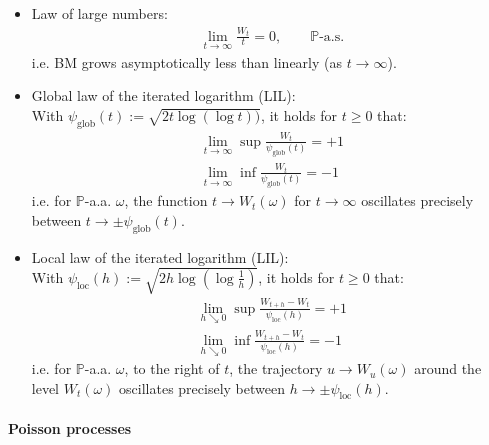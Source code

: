\documentclass[a4paper,landscape,8pt,fleqn]{scrartcl}
\begin{document}
\begin{multicols*}{3}
\begin{itemize}
\item Law of large numbers:
\begin{align*}
\lim_{t \rightarrow \infty} \frac{W_t}{t} = 0, \qquad \mathbb{P}\text{-a.s.}
\end{align*}
i.e. BM grows asymptotically less than linearly (as $t \rightarrow \infty$).
\item Global law of the iterated logarithm (LIL): \\
With $\psi_\text{glob}(t) := \sqrt{2 t \log(\log t))}$, it holds for $t \geq 0$ that:
\begin{align*}
\lim_{t \rightarrow \infty} \sup \frac{W_t}{\psi_\text{glob}(t)} = +1 \\
\lim_{t \rightarrow \infty} \inf \frac{W_t}{\psi_\text{glob}(t)} = -1
\end{align*}
i.e. for $\mathbb{P}$-a.a. $\omega$, the function $t \rightarrow W_t(\omega)$ for $t \rightarrow \infty$ oscillates precisely between $t \rightarrow \pm \psi_\text{glob}(t)$.
\item Local law of the iterated logarithm (LIL): \\
With $\psi_\text{loc}(h) := \sqrt{2 h \log(\log \frac{1}{h})}$, it holds for $t \geq 0$ that:
\begin{align*}
\lim\limits_{h \searrow 0} \sup \frac{W_{t+h} - W_t}{\psi_\text{loc}(h)} = +1 \\
\lim\limits_{h \searrow 0} \inf \frac{W_{t+h} - W_t}{\psi_\text{loc}(h)} = -1
\end{align*}
i.e. for $\mathbb{P}$-a.a. $\omega$, to the right of $t$, the trajectory $u \rightarrow W_u(\omega)$ around the level $W_t(\omega)$ oscillates precisely between $h \rightarrow \pm \psi_\text{loc}(h)$.
\end{itemize}

\paragraph{Poisson processes}


\end{multicols*}
\end{document}
